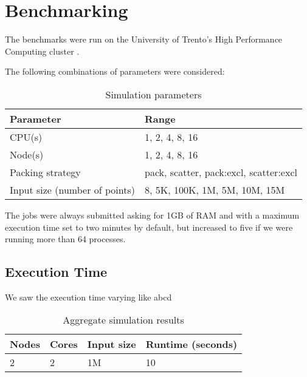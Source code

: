 \section{Benchmarking}
\label{sec:benchmarking}

The benchmarks were run on the University of Trento's High Performance Computing cluster
.

The following combinations of parameters were considered:

\begin{table}[ht]
      \centering
      \caption{Simulation parameters}
      \begin{tabular}{l|l}
            \hline
            Parameter                     & Range                                    \\
            \hline
            CPU(s)                        & {1, 2, 4, 8, 16}                         \\
            Node(s)                       & {1, 2, 4, 8, 16}                         \\
            Packing strategy              & {pack, scatter, pack:excl, scatter:excl} \\
            Input size (number of points) & {8, 5K, 100K, 1M, 5M, 10M, 15M }         \\
            \hline
      \end{tabular}
\end{table}

The jobs were always submitted asking for 1GB of RAM and with a maximum execution time set to two minutes by default, but increased to five if we were running more than 64 processes.


\subsection{Execution Time}

We saw the execution time varying like abcd
\begin{table}[ht]
      \centering
      \caption{Aggregate simulation results}
      \begin{tabular}{l|l|l|l}
            \hline
            Nodes & Cores & Input size & Runtime (seconds) \\
            \hline
            2     & 2     & 1M         & 10                \\
            \hline
      \end{tabular}
\end{table}

